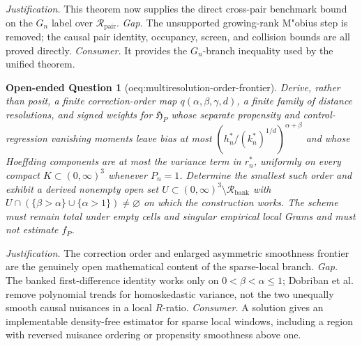 \documentclass{article}
\newtheorem{openendedquestion}{Open-ended Question}
\begin{document}
\par\smallskip\noindent \textit{Justification.} This theorem now supplies the direct cross-pair benchmark bound on the \(G_n\) label over \(\mathcal R_{\mathrm{pair}}\). \textit{Gap.} The unsupported growing-rank M"obius step is removed; the causal pair identity, occupancy, screen, and collision bounds are all proved directly. \textit{Consumer.} It provides the \(G_n\)-branch inequality used by the unified theorem.

\begin{openendedquestion}[oeq:multiresolution-order-frontier]\label{oeq:multiresolution-order-frontier}
Derive, rather than posit, a finite correction-order map \(q(\alpha,\beta,\gamma,d)\), a finite family of distance resolutions, and signed weights for \(\mathfrak H_P\) whose separate propensity and control-regression vanishing moments leave bias at most \((h_n^*/(k_n^*)^{1/d})^{\alpha+\beta}\) and whose Hoeffding components are at most the variance term in \(r_n^*\), uniformly on every compact \(K\subset(0,\infty)^3\) whenever \(P_n=1\). Determine the smallest such order and exhibit a derived nonempty open set \(U\subset(0,\infty)^3\setminus\mathcal R_{\mathrm{bank}}\) with \(U\cap(\{\beta>\alpha\}\cup\{\alpha>1\})\neq\varnothing\) on which the construction works. The scheme must remain total under empty cells and singular empirical local Grams and must not estimate \(f_P\).
\end{openendedquestion}
\par\smallskip\noindent \textit{Justification.} The correction order and enlarged asymmetric smoothness frontier are the genuinely open mathematical content of the sparse-local branch. \textit{Gap.} The banked first-difference identity works only on \(0<\beta<\alpha\leq1\); Dobriban et al. remove polynomial trends for homoskedastic variance, not the two unequally smooth causal nuisances in a local \(R\)-ratio. \textit{Consumer.} A solution gives an implementable density-free estimator for sparse local windows, including a region with reversed nuisance ordering or propensity smoothness above one.
\end{document}
